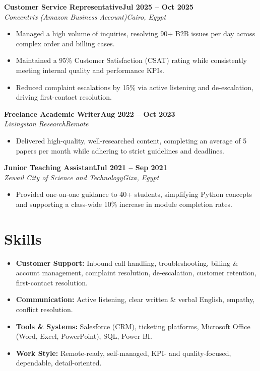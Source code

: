 \documentclass[11pt,a4paper]{article}
\newcommand{\role}[4]{%
  \vspace{1pt}%
  \noindent\textbf{#1}\hfill\textbf{#2}\\[0.5pt]%
  \textit{#3}\hfill\textit{#4}\par\vspace{1pt}%
}
\begin{document}
\role{Customer Service Representative}{Jul 2025 -- Oct 2025}{Concentrix (Amazon Business Account)}{Cairo, Egypt}
\begin{itemize}
  \item Managed a high volume of inquiries, resolving 90+ B2B issues per day across complex order and billing cases.
  \item Maintained a 95\% Customer Satisfaction (CSAT) rating while consistently meeting internal quality and performance KPIs.
  \item Reduced complaint escalations by 15\% via active listening and de-escalation, driving first-contact resolution.
\end{itemize}

\role{Freelance Academic Writer}{Aug 2022 -- Oct 2023}{Livingston Research}{Remote}
\begin{itemize}
  \item Delivered high-quality, well-researched content, completing an average of 5 papers per month while adhering to strict guidelines and deadlines.
\end{itemize}

\role{Junior Teaching Assistant}{Jul 2021 -- Sep 2021}{Zewail City of Science and Technology}{Giza, Egypt}
\begin{itemize}
  \item Provided one-on-one guidance to 40+ students, simplifying Python concepts and supporting a class-wide 10\% increase in module completion rates.
\end{itemize}

\section{Skills}
\begin{itemize}
  \item \textbf{Customer Support:} Inbound call handling, troubleshooting, billing \& account management, complaint resolution, de-escalation, customer retention, first-contact resolution.
  \item \textbf{Communication:} Active listening, clear written \& verbal English, empathy, conflict resolution.
  \item \textbf{Tools \& Systems:} Salesforce (CRM), ticketing platforms, Microsoft Office (Word, Excel, PowerPoint), SQL, Power BI.
  \item \textbf{Work Style:} Remote-ready, self-managed, KPI- and quality-focused, dependable, detail-oriented.
\end{itemize}
\end{document}
